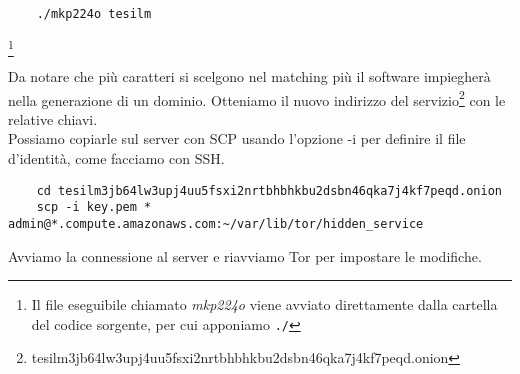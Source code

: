 \begin{lstlisting}
    ./mkp224o tesilm
\end{lstlisting}
\footnote{Il file eseguibile chiamato \emph{mkp224o} viene avviato direttamente dalla cartella del codice sorgente, per cui apponiamo \lstinline{./}}

Da notare che più caratteri si scelgono nel matching più il software impiegherà nella generazione di un dominio. 
Otteniamo il nuovo indirizzo del servizio\footnote{tesilm3jb64lw3upj4uu5fsxi2nrtbhbhkbu2dsbn46qka7j4kf7peqd.onion} con le relative chiavi. \\
Possiamo copiarle sul server con SCP usando l'opzione -i per definire il file d'identità, come facciamo con SSH.

\begin{lstlisting}
    cd tesilm3jb64lw3upj4uu5fsxi2nrtbhbhkbu2dsbn46qka7j4kf7peqd.onion
    scp -i key.pem * admin@*.compute.amazonaws.com:~/var/lib/tor/hidden_service
\end{lstlisting}

Avviamo la connessione al server e riavviamo Tor per impostare le modifiche.



\newpage

